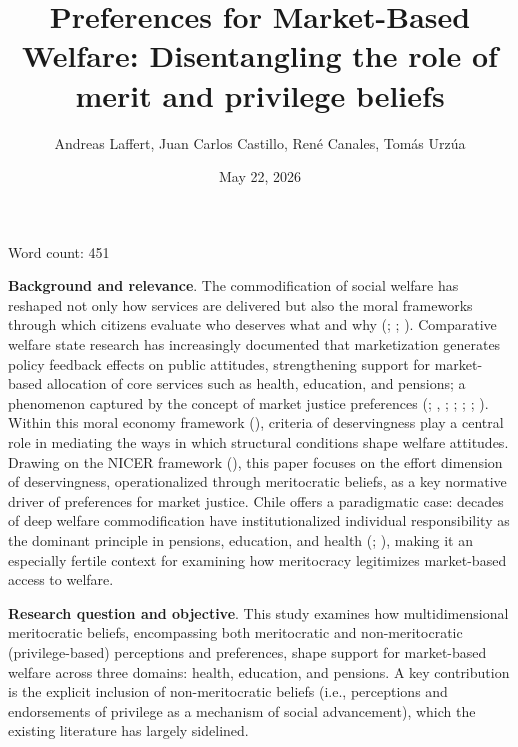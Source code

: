 \documentclass[
  13pt,
]{article}
\title{Preferences for Market-Based Welfare: Disentangling the role of
merit and privilege beliefs}
\author{Andreas Laffert, Juan Carlos Castillo, René Canales, Tomás
Urzúa}
\affil{Department of Sociology, University of Chile}
\date{May 22, 2026}
\begin{document}
\maketitle


Word count: 451

\textbf{Background and relevance}. The commodification of social welfare
has reshaped not only how services are delivered but also the moral
frameworks through which citizens evaluate who deserves what and why
(;
;
).
Comparative welfare state research has increasingly documented that
marketization generates policy feedback effects on public attitudes,
strengthening support for market-based allocation of core services such
as health, education, and pensions; a phenomenon captured by the concept
of market justice preferences
(;
,
;
;
;
;
). Within this
moral economy framework (), criteria of deservingness play a central role in mediating the
ways in which structural conditions shape welfare attitudes. Drawing on
the NICER framework (), this paper focuses on the effort dimension of deservingness,
operationalized through meritocratic beliefs, as a key normative driver
of preferences for market justice. Chile offers a paradigmatic case:
decades of deep welfare commodification have institutionalized
individual responsibility as the dominant principle in pensions,
education, and health (; ), making it an especially fertile context for examining how
meritocracy legitimizes market-based access to welfare.

\textbf{Research question and objective}. This study examines how
multidimensional meritocratic beliefs, encompassing both meritocratic
and non-meritocratic (privilege-based) perceptions and preferences,
shape support for market-based welfare across three domains: health,
education, and pensions. A key contribution is the explicit inclusion of
non-meritocratic beliefs (i.e., perceptions and endorsements of
privilege as a mechanism of social advancement), which the existing
literature has largely sidelined.
\end{document}
